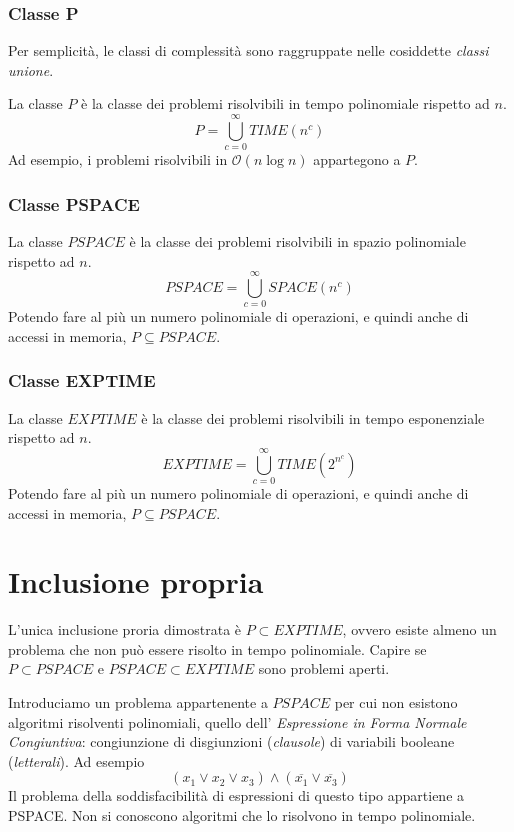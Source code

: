 \documentclass[11pt]{book}
\begin{document}
\subsubsection{Classe P}
Per semplicità, le classi di complessità sono raggruppate nelle cosiddette \textit{classi unione}.

La classe $P$ è la classe dei problemi risolvibili in tempo polinomiale rispetto ad $n$.
\begin{equation*}
    P=\bigcup^{\infty}_{c=0}TIME(n^c)
\end{equation*}
Ad esempio, i problemi risolvibili in $\mathcal{O}(n\log n)$ appartegono a $P$.
\subsubsection{Classe PSPACE}
La classe $PSPACE$ è la classe dei problemi risolvibili in spazio polinomiale rispetto ad $n$.
\begin{equation*}
    PSPACE=\bigcup^{\infty}_{c=0}SPACE(n^c)
\end{equation*}
Potendo fare al più un numero polinomiale di operazioni, e quindi anche di accessi in memoria, $P\subseteq PSPACE$.
\subsubsection{Classe EXPTIME}
La classe $EXPTIME$ è la classe dei problemi risolvibili in tempo esponenziale rispetto ad $n$.
\begin{equation*}
    EXPTIME=\bigcup^{\infty}_{c=0}TIME(2^{n^{c}})
\end{equation*}
Potendo fare al più un numero polinomiale di operazioni, e quindi anche di accessi in memoria, $P\subseteq PSPACE$.
\section{Inclusione propria}
L'unica inclusione proria dimostrata è $P\subset EXPTIME$, ovvero esiste almeno un problema che non può essere risolto in 
tempo polinomiale. Capire se $P\subset PSPACE$ e $PSPACE\subset EXPTIME$ sono problemi aperti.

Introduciamo un problema appartenente a $PSPACE$ per cui non esistono algoritmi risolventi polinomiali, quello dell'
\textit{Espressione in Forma Normale Congiuntiva}: congiunzione di disgiunzioni (\textit{clausole}) di variabili booleane
(\textit{letterali}). Ad esempio
\begin{equation*}
    (x_1 \vee x_2 \vee x_3) \wedge (\overline{x_1}\vee \overline{x_3})
\end{equation*}
Il problema della soddisfacibilità di espressioni di questo tipo appartiene a PSPACE. Non si conoscono algoritmi che lo 
risolvono in tempo polinomiale.
\end{document}
